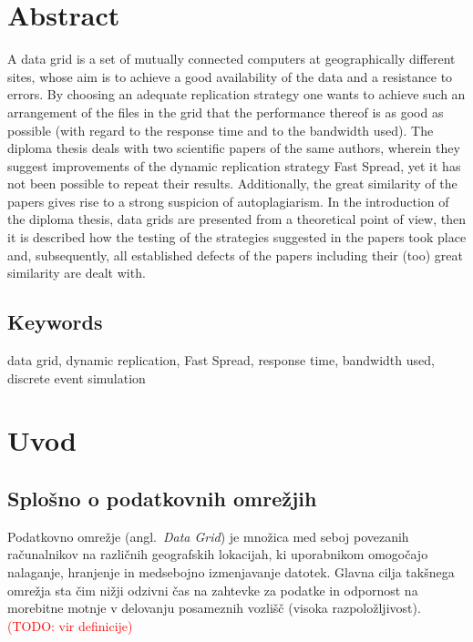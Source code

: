 \documentclass[a4paper, 12pt]{book}
\newcommand{\TODO}[1]{\textcolor{red}{(TODO: #1)}}
\newcommand{\clearemptydoublepage}{
	\newpage{\pagestyle{empty}\cleardoublepage}}
\begin{document}
\chapter*{Abstract}

A data grid is a set of mutually connected computers at geographically
different sites, whose aim is to achieve a good availability of the data
and a resistance to errors. By choosing an adequate replication strategy one
wants to achieve such an arrangement of the files in the grid that the
performance thereof is as good as possible (with regard to the response time
and to the bandwidth used). The diploma thesis deals with two scientific papers
of the same authors, wherein they suggest improvements of the dynamic
replication strategy Fast Spread, yet it has not been possible to repeat their
results. Additionally, the great similarity of the papers gives rise to a
strong suspicion of autoplagiarism. In the introduction of the diploma thesis,
data grids are presented from a theoretical point of view, then it is
described how the testing of the strategies suggested in the papers took place
and, subsequently, all established defects of the papers including their (too)
great similarity are dealt with.

\section*{Keywords}
data grid, dynamic replication, Fast Spread, response time, bandwidth used,
discrete event simulation


\clearemptydoublepage


\mainmatter
\setcounter{page}{1}
\pagestyle{fancy}

\chapter{Uvod}

\section{Splošno o podatkovnih omrežjih}

Podatkovno omrežje (angl.~\textit{Data Grid}) je množica med seboj
povezanih ra\-ču\-nal\-ni\-kov na različnih geografskih lokacijah, ki
uporabnikom omogočajo nalaganje, hranjenje in medsebojno izmenjavanje datotek.
Glavna cilja takšnega omrežja sta čim nižji odzivni čas na zahtevke za
podatke in odpornost na morebitne motnje v delovanju posameznih vozlišč
(visoka razpoložljivost). \TODO{vir definicije}
\end{document}
